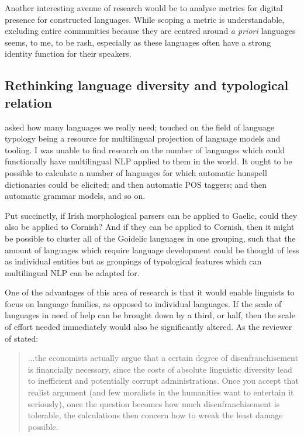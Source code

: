 Another interesting avenue of research would be to analyse metrics for digital presence for constructed languages. While scoping a metric is understandable, excluding entire communities because they are centred around \textit{a priori} languages seems, to me, to be rash, especially as these languages often have a strong identity function for their speakers.

\subsection{Rethinking language diversity and typological relation}

\citet{ginsburgh2011many} asked how many languages we really need; \citet{bender2010grand, bender2016linguistic} touched on the field of language typology being a resource for multilingual projection of language models and tooling. I was unable to find research on the number of languages which could functionally have multilingual NLP applied to them in the world. It ought to be possible to calculate a number of languages for which automatic hunspell dictionaries could be elicited; and then automatic POS taggers; and then automatic grammar models, and so on.

Put succinctly, if Irish morphological parsers can be applied to Gaelic, could they also be applied to Cornish? And if they can be applied to Cornish, then it might be possible to cluster all of the Goidelic languages in one grouping, such that the amount of languages which require language development could be thought of less as individual entities but as groupings of typological features which can multilingual NLP can be adapted for.

One of the advantages of this area of research is that it would enable linguists to focus on language families, as opposed to individual languages. If the scale of languages in need of help can be brought down by a third, or half, then the scale of effort needed immediately would also be significantly altered. As the reviewer of \citet{ginsburgh2011many} stated:

\begin{quote}
...the economists actually argue that a certain degree of disenfranchisement is financially necessary, since the costs of absolute linguistic diversity lead to inefficient and potentially corrupt administrations. Once you accept that realist argument (and few moralists in the humanities want to entertain it seriously), once the question becomes how much disenfranchisement is tolerable, the calculations then concern how to wreak the least damage possible. \citep[672--673]{pym2013how}
\end{quote}

